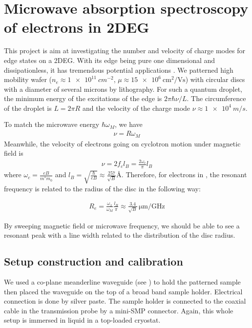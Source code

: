\documentclass[12pt]{ruthesis}
\begin{document}
\chapter{Microwave absorption spectroscopy of electrons in 2DEG}\label{Absorption}

This project is aim at investigating the number and velocity of charge modes for edge states on a 2DEG.
With its edge being pure one dimensional and dissipationless, it has tremendous potential applications \cite{PhysRevB.88.165305}.
We patterned high mobility  wafer ($n_{e} \approx \SI{1e11}{cm^{-2}}$, $\mu \approx \SI{15 e6}{\cm^{2}/\volt \second}$) with circular discs with a diameter of several microns by lithography. 
For such a quantum droplet, the minimum energy of the excitations of the edge is $2\pi \hbar \nu /L$. 
The circumference of the droplet is $L=2\pi R$ and the velocity of the charge mode $\nu \approx \SI{1e4}{m/s}$.

To match the microwave energy $\hbar \omega_{M}$, we have 
\begin{align}
\nu = R \omega_{M}
\end{align}
Meanwhile, the velocity of electrons going on cyclotron motion under magnetic field is 
\begin{align}
\nu = 2 f_{c} l_{B}= \frac{2 \omega_{c}}{\pi} l_{B} 
\end{align}
where $\displaystyle \omega_{c}= \frac{eB}{m^{\ast}m_{0}}$ and $\displaystyle l_{B}=\sqrt{\frac{\hbar}{eB}} \approx \frac{257}{\sqrt{B}} \si{\angstrom}$.
Therefore, for electrons in , the resonant frequency is related to the radius of the disc in the following way:

\begin{align}
R_{e}= \frac{\omega_{x}}{\omega_{M}} \frac{l_{B}}{\pi} \approx \frac{3.4}{\sqrt{B}} \, \si{\micro\meter/\giga\hertz}
\end{align}

By sweeping magnetic field or microwave frequency, we should be able to see a resonant peak with a line width related to the distribution of the disc radius. 


\section{Setup construction and calibration}\label{Construction}

We used a co-plane meanderline waveguide (see \cite{APLBroadbandESR}) to hold the patterned sample then placed the waveguide on the top of a broad band sample holder.
Electrical connection is done by silver paste.  
The sample holder is connected to the coaxial cable in the transmission probe by a mini-SMP connector.
Again, this whole setup is immersed in  liquid in a top-loaded cryostat.
\end{document}
